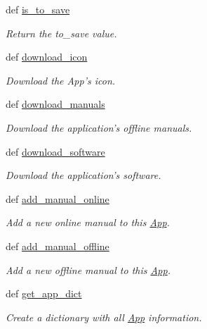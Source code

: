 \begin{CompactItemize}
def \hyperlink{classwinsollib_1_1App_2ad23a009d1ec4b059efd94aa3266011}{is\_\-to\_\-save}
\begin{CompactList}\small\item\em Return the {\em to\_\-save\/} value. \item\end{CompactList}\item 
def \hyperlink{classwinsollib_1_1App_d03267022a1b50182e48afd7da8406a6}{download\_\-icon}
\begin{CompactList}\small\item\em Download the App's icon. \item\end{CompactList}\item 
def \hyperlink{classwinsollib_1_1App_d145c233b265221b3dc00d37cbf09667}{download\_\-manuals}
\begin{CompactList}\small\item\em Download the application's offline manuals. \item\end{CompactList}\item 
def \hyperlink{classwinsollib_1_1App_61771bfbd935b893fd056b8f77063932}{download\_\-software}
\begin{CompactList}\small\item\em Download the application's software. \item\end{CompactList}\item 
def \hyperlink{classwinsollib_1_1App_7d4de96b97f8eac2ceab3ec79443441b}{add\_\-manual\_\-online}
\begin{CompactList}\small\item\em Add a new online manual to this \hyperlink{classwinsollib_1_1App}{App}. \item\end{CompactList}\item 
def \hyperlink{classwinsollib_1_1App_961613abdf28b7c3d5aaffb0ed83ebbf}{add\_\-manual\_\-offline}
\begin{CompactList}\small\item\em Add a new offline manual to this \hyperlink{classwinsollib_1_1App}{App}. \item\end{CompactList}\item 
def \hyperlink{classwinsollib_1_1App_1f799cba6ad125678e28f1b072638a3f}{get\_\-app\_\-dict}
\begin{CompactList}\small\item\em Create a dictionary with all \hyperlink{classwinsollib_1_1App}{App} information. \item\end{CompactList}\item 

\end{CompactItemize}
